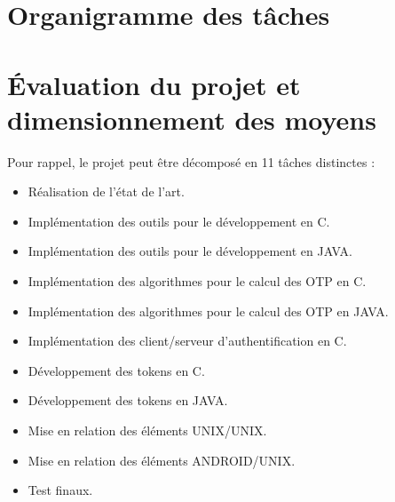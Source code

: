 \documentclass{../../res/univ-projet}
\begin{document}
\section{Organigramme des t\^aches}

\section{Évaluation du projet et dimensionnement des moyens}
Pour rappel, le projet peut être décomposé en 11 tâches distinctes :
\begin{itemize}
  \item Réalisation de l'état de l'art.
  \item Implémentation des outils pour le développement en C.
  \item Implémentation des outils pour le développement en JAVA.
  \item Implémentation des algorithmes pour le calcul des OTP en C.
  \item Implémentation des algorithmes pour le calcul des OTP en JAVA.
  \item Implémentation des client/serveur d'authentification en C.
  \item Développement des tokens en C.
  \item Développement des tokens en JAVA.
  \item Mise en relation des éléments UNIX/UNIX.
  \item Mise en relation des éléments ANDROID/UNIX.
  \item Test finaux.
\end{itemize}
\end{document}
